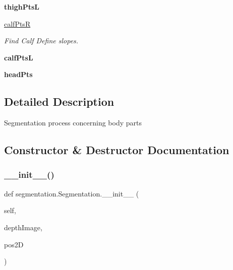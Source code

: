 \begin{DoxyCompactItemize}
{\bfseries thigh\+PtsL}
\item 
\mbox{\label{classsegmentation_1_1_segmentation_aa926f14b37ee6275803ad15bbf417310}} 
\hyperlink{classsegmentation_1_1_segmentation_aa926f14b37ee6275803ad15bbf417310}{calf\+PtsR}
\begin{DoxyCompactList}\small\item\em Find Calf Define slopes. \end{DoxyCompactList}\item 
\mbox{\label{classsegmentation_1_1_segmentation_a31e43c1089bb4017d23601a86c13fba7}} 
{\bfseries calf\+PtsL}
\item 
\mbox{\label{classsegmentation_1_1_segmentation_a560a42d6f83dfe01e32efb93fff9eecf}} 
{\bfseries head\+Pts}
\end{DoxyCompactItemize}


\subsection{Detailed Description}
\begin{DoxyVerb}Segmentation process concerning body parts
\end{DoxyVerb}
 

\subsection{Constructor \& Destructor Documentation}
\mbox{\label{classsegmentation_1_1_segmentation_a1a50054187dc1e2eebe8685fdd208bf6}} 
\subsubsection{\texorpdfstring{\+\_\+\+\_\+init\+\_\+\+\_\+()}{\_\_init\_\_()}}
{\footnotesize\ttfamily def segmentation.\+Segmentation.\+\_\+\+\_\+init\+\_\+\+\_\+ (\begin{DoxyParamCaption}\item[{}]{self,  }\item[{}]{depth\+Image,  }\item[{}]{pos2D }\end{DoxyParamCaption})}

